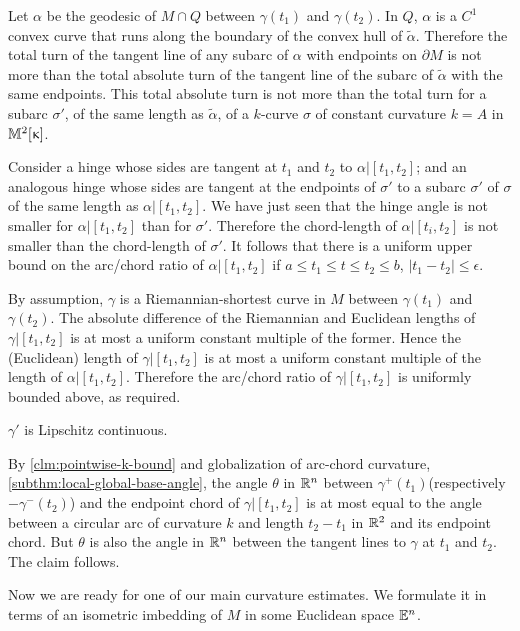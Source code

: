 Let $\alpha$ be the geodesic of $M\cap Q$ between $\gamma(t_1)$ and $\gamma(t_2)$. 
  In $Q$, $\alpha$ is a $C^1$ convex curve that runs along the boundary of the convex hull of $\tilde\alpha$.  Therefore the total turn of  the tangent line of any subarc of  $\alpha$ with endpoints on $\partial M$  is not more than the total absolute turn of the tangent line of the subarc of  $\tilde\alpha$ with the same endpoints. This total absolute turn is not more than the total turn for a subarc $\sigma'$,  of the same length as $\tilde\alpha$, of a $k$-curve $\sigma$ of constant curvature $k=A$ in $\mathbb{M}_{{}}^{2}[{\upkappa}]$.  

Consider a hinge whose sides are tangent  at $t_1$ and $t_2$ to $\alpha|[t_1,t_2]$; and an analogous hinge whose sides are tangent  at the endpoints of $\sigma'$ to a subarc $\sigma'$ of $\sigma$ of the same length as $\alpha|[t_1,t_2]$.  We have just seen that the hinge angle is not smaller for $\alpha|[t_1,t_2]$ than for $\sigma'$.  Therefore the 
chord-length of $\alpha|[t_i,t_2]$ is not smaller than  the chord-length of $\sigma'$.  It follows that there is a uniform upper bound on the arc/chord ratio of $\alpha|[t_1,t_2]$ if   $a\le t_1\le t\le t_2\le b$, $|t_1-t_2|\le \epsilon$.

By assumption, $\gamma$ is a Riemannian-shortest curve in $M$ between $\gamma(t_1)$ and $\gamma(t_2)$. The absolute difference of the Riemannian and Euclidean lengths of $\gamma|[t_1,t_2]$ 
 is at most a uniform constant multiple of the former. Hence the (Euclidean) length of $\gamma|[t_1,t_2]$
  is at most a uniform constant  multiple of the length of $\alpha|[t_1,t_2]$.   Therefore the arc/chord ratio of $\gamma|[t_1,t_2]$ is uniformly bounded above, as required.

\begin{clm}{}\label{clm:global-k-bound}$\gamma'$ is Lipschitz continuous. 
\end{clm}
By \ref{clm:pointwise-k-bound} and globalization of arc-chord curvature, 
\ref{subthm:local-global-base-angle}, the angle $\theta$ in $\mathbb{R}^n$ between $\gamma^+(t_1)$(respectively $-\gamma^-(t_2)$)  and the endpoint chord of $\gamma|[t_1,t_2]$ is at most equal to the angle between a circular arc of curvature $k$ and length $t_2-t_1$  in $\mathbb{R}^2$ and  its endpoint chord.  But $\theta$ is also the angle in $\mathbb{R}^n$ between the tangent lines to $\gamma$ at $t_1$ and $t_2$.  The claim follows.
\qeds

Now we are ready for one of our main curvature estimates. We formulate it in terms of an 
isometric imbedding of $M$ in some Euclidean space $\mathbb{E}^n$. 

